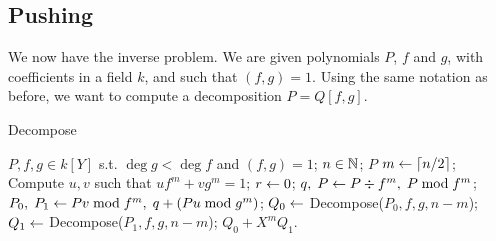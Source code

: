 \documentclass{sig-alternate}
\begin{document}
\subsection{Pushing}
We now have the inverse problem. We are given polynomials $P$, $f$ and
$g$, with coefficients in a field $k$, and such that $(f,g)=1$. Using
the same notation as before, we want to compute a decomposition
$P=Q[f,g]$.

\begin{algorithm}[t]
  \caption{Decompose}
  \label{alg:decompose}
  \begin{algorithmic}[1]
    \REQUIRE $P,f,g\in k[Y]$ s.t. $\deg g<\deg f$ and $(f,g)=1$;
    \REQUIRE $n\in\mathbb{N}$;
    \ENSURE $P$
    \ELSE
    \STATE $m \leftarrow \lceil n/2 \rceil$;
    \STATE \label{alg:decompose:xgcd}
    Compute $u, v$ such that $uf^m + vg^m = 1$;
    \STATE $r \leftarrow 0$;
    \STATE \label{alg:decompose:div}
    $q,\; P \leftarrow P \div f^m,\; P \bmod f^m$;
    \ENDIF
    \STATE \label{alg:decompose:split}
    $P_0,\; P_1 \leftarrow Pv \bmod f^m,\; q + (Pu \bmod g^m)$;
    \STATE $Q_0 \leftarrow$ Decompose($P_0, f, g, n-m$);
    \STATE $Q_1 \leftarrow$ Decompose($P_1, f, g, n-m$);
    \ENSURE $Q_0 + X^mQ_1$.
    \ENDIF
  \end{algorithmic}
\end{algorithm}
\end{document}
